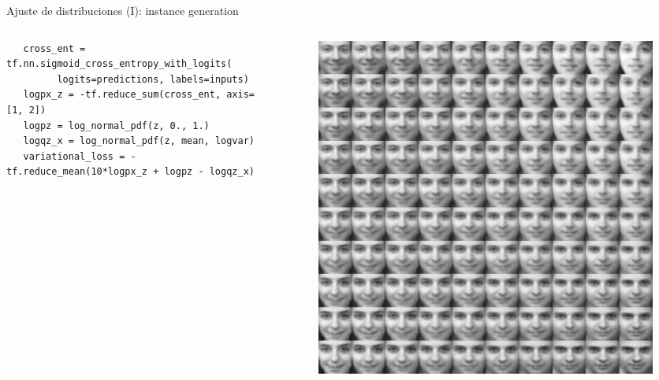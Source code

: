 \documentclass[13.5pt,aspectratio=169]{beamer}
\begin{document}
\begin{frame}[fragile]{Ajuste de distribuciones (I): instance generation}
     \begin{columns}
        \begin{column}{.6\linewidth}
           
\scriptsize\begin{verbatim}
   cross_ent = tf.nn.sigmoid_cross_entropy_with_logits(
         logits=predictions, labels=inputs)
   logpx_z = -tf.reduce_sum(cross_ent, axis=[1, 2])
   logpz = log_normal_pdf(z, 0., 1.)
   logqz_x = log_normal_pdf(z, mean, logvar)
   variational_loss = -tf.reduce_mean(10*logpx_z + logpz - logqz_x)
   \end{verbatim}\normalsize
        \end{column}\hfill
        \begin{column}{.3\linewidth}

         \begin{figure}[ht!]
            \centering
            \includegraphics[width=\linewidth]{images/variational-matrix.png}
         \label{fig:sampledfaces}
         \end{figure}           
        \end{column}
     \end{columns}

     \end{frame}
\end{document}
